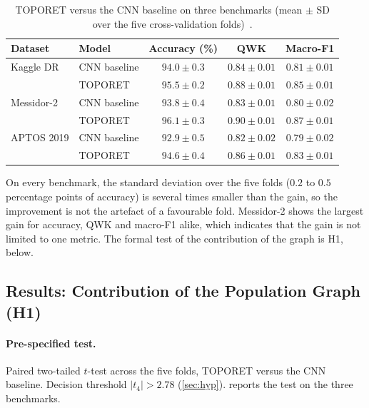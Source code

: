 \begin{table}[!htbp]
\centering
\caption[TOPORET results on three benchmarks]{TOPORET versus the CNN baseline on three benchmarks (mean $\pm$ SD over
the five cross-validation folds)~\cite{belhadj2025plos}.}
\label{tab:crossdata}
\small
\begin{tabular}{@{}llccc@{}}
\toprule
Dataset & Model & Accuracy (\%) & QWK & Macro-F1 \\
\midrule
Kaggle DR & CNN baseline & $94.0\pm0.3$ & $0.84\pm0.01$ & $0.81\pm0.01$ \\
 & TOPORET & $\mathbf{95.5\pm0.2}$ & $\mathbf{0.88\pm0.01}$ & $\mathbf{0.85\pm0.01}$ \\
\midrule
Messidor-2 & CNN baseline & $93.8\pm0.4$ & $0.83\pm0.01$ & $0.80\pm0.02$ \\
 & TOPORET & $\mathbf{96.1\pm0.3}$ & $\mathbf{0.90\pm0.01}$ & $\mathbf{0.87\pm0.01}$ \\
\midrule
APTOS 2019 & CNN baseline & $92.9\pm0.5$ & $0.82\pm0.02$ & $0.79\pm0.02$ \\
 & TOPORET & $\mathbf{94.6\pm0.4}$ & $\mathbf{0.86\pm0.01}$ & $\mathbf{0.83\pm0.01}$ \\
\bottomrule
\end{tabular}
\end{table}

On every benchmark, the standard deviation over the five folds ($0.2$ to $0.5$
percentage points of accuracy) is several times smaller than the gain, so the
improvement is not the artefact of a favourable fold. Messidor-2 shows the largest
gain for accuracy, QWK and macro-F1 alike, which indicates that the gain is not
limited to one metric. The formal test of the contribution of the graph is H1,
below.

\subsection{Results: Contribution of the Population Graph (H1)}
\label{sec:h1}

\paragraph{Pre-specified test.}
Paired two-tailed $t$-test across the five folds, TOPORET versus the CNN baseline.
Decision threshold $|t_4|>2.78$ (\cref{sec:hyp}).  reports the test on the
three benchmarks.

